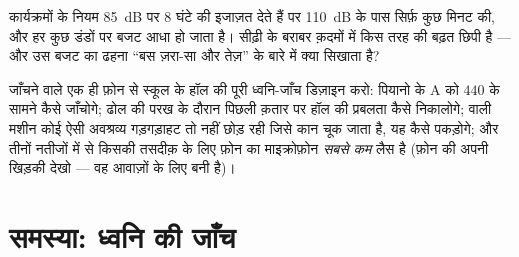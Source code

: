 \begin{exercise}[$\star\star$]\label{exo:g8:sound-pitch-loudness:11}
कार्यक्रमों के नियम \qty{85}{dB} पर $8$ घंटे की इजाज़त देते हैं पर
\qty{110}{dB} के पास सिर्फ़ कुछ मिनट की, और हर कुछ डंडों पर बजट आधा हो
जाता है। सीढ़ी के बराबर क़दमों में किस तरह की बढ़त छिपी है --- और उस
बजट का ढहना ``बस ज़रा-सा और तेज़'' के बारे में क्या सिखाता है?
\end{exercise}

\begin{exercise}[$\star\star\star$]\label{exo:g8:sound-pitch-loudness:12}
जाँचने वाले एक ही फ़ोन से स्कूल के हॉल की पूरी ध्वनि-जाँच डिज़ाइन करो:
पियानो के A को $440$ के सामने कैसे जाँचोगे; ढोल की परख के दौरान
पिछली क़तार पर हॉल की प्रबलता कैसे निकालोगे;  वाली मशीन कोई ऐसी
अवश्रव्य गड़गड़ाहट तो नहीं छोड़ रही जिसे कान चूक जाता है, यह कैसे
पकड़ोगे; और तीनों नतीजों में से किसकी तसदीक़ के लिए फ़ोन का
माइक्रोफ़ोन \emph{सबसे कम} लैस है (फ़ोन की अपनी  खिड़की देखो ---
वह आवाज़ों के लिए बनी है)।
\end{exercise}

\section{समस्या: ध्वनि की जाँच}

